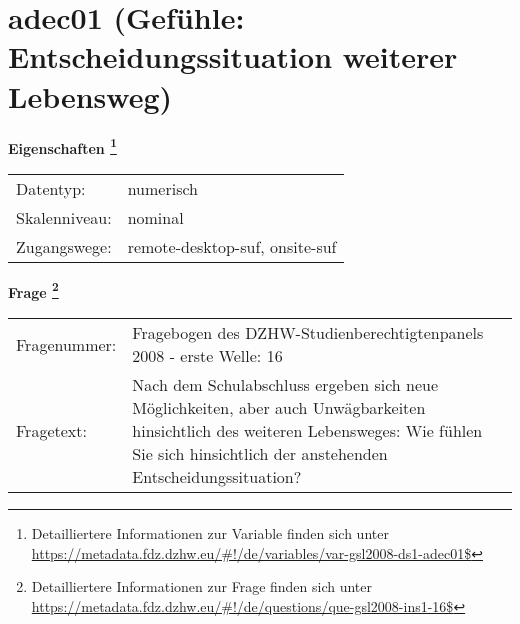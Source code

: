 
    \setcounter{footnote}{0}

    \vspace*{-1.8cm}
	\section{adec01 (Gefühle: Entscheidungssituation weiterer Lebensweg)}
	\label{section:adec01}



    \vspace*{0.5cm}
    \noindent\textbf{Eigenschaften
	\footnote{Detailliertere Informationen zur Variable finden sich unter
		\url{https://metadata.fdz.dzhw.eu/\#!/de/variables/var-gsl2008-ds1-adec01$}}}\\
	\begin{tabularx}{\hsize}{@{}lX}
	Datentyp: & numerisch \\
	Skalenniveau: & nominal \\
	Zugangswege: &
	  remote-desktop-suf, 
	  onsite-suf
 \\
    \end{tabularx}



				\vspace*{0.5cm}
                \noindent\textbf{Frage
	                \footnote{Detailliertere Informationen zur Frage finden sich unter
		              \url{https://metadata.fdz.dzhw.eu/\#!/de/questions/que-gsl2008-ins1-16$}}}\\
				\begin{tabularx}{\hsize}{@{}lX}
					Fragenummer: &
					  Fragebogen des DZHW-Studienberechtigtenpanels 2008 - erste Welle:
					  16
 \\
					Fragetext: & Nach dem Schulabschluss ergeben sich neue Möglichkeiten, aber auch Unwägbarkeiten hinsichtlich des weiteren Lebensweges: Wie fühlen Sie sich hinsichtlich der anstehenden Entscheidungssituation? \\
				\end{tabularx}





